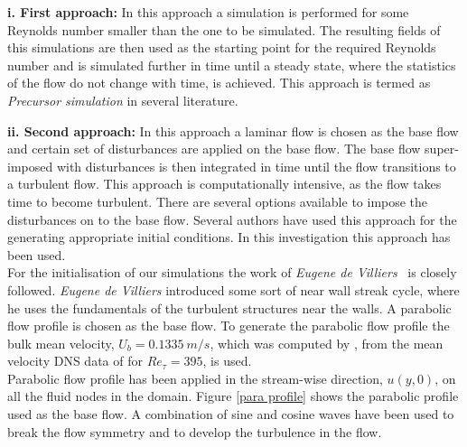 \textbf{i. First approach:} In this approach a simulation is performed for some Reynolds number smaller than the one to be simulated. The resulting fields of this simulations are then used as the starting point for the required Reynolds number and is  simulated further in time until a steady state, where the statistics of the flow do not change with time, is achieved. This approach is termed as \emph{Precursor simulation} in several literature.

\textbf{ii. Second approach: } In this approach a laminar flow is chosen as the base flow and certain set of disturbances are applied on the base flow. The base flow super-imposed with disturbances is then integrated in time until the flow transitions to a turbulent flow. This approach is computationally intensive, as the flow takes time to become turbulent. There are several options available to impose the disturbances on to the base flow. Several authors have used this approach for the generating appropriate initial conditions. In this investigation this approach has been used.\\

For the initialisation of our simulations the work of \emph{Eugene de Villiers}~\cite{devilliers:phd} is closely followed. \emph{Eugene de Villiers} introduced some sort of near wall streak cycle, where he uses the fundamentals of the turbulent structures near the walls. A parabolic flow profile is chosen as the base flow. To generate the parabolic flow profile the bulk mean velocity, $U_b = 0.1335\ m/s$, which was computed by \cite{devilliers:phd}, from the mean velocity DNS data of \cite{moser:kim:mansour:99} for $Re_\tau = 395$, is used.\\

Parabolic flow profile has been applied in the stream-wise direction, $u(y,0)$,  on all the fluid nodes in the domain. Figure \ref{para profile} shows the parabolic profile used as the base flow. A combination of sine and cosine waves have been used to break the flow symmetry and to develop the turbulence in the flow. 

